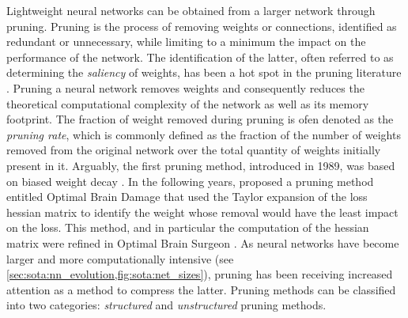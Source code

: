 Lightweight neural networks can be obtained from a larger network through
pruning. Pruning is the process of removing weights or connections, identified
as redundant or unnecessary, while limiting to a minimum the impact on the
performance of the network. The identification of the latter, often referred to
as determining the \emph{saliency} of weights, has been a hot spot in the
pruning literature \cite{li2023model,cheng2017survey,liang2021pruning}. Pruning
a neural network removes weights and consequently reduces the theoretical
computational complexity of the network as well as its memory footprint.  The
fraction of weight removed during pruning is ofen denoted as the \emph{pruning
rate}, which is commonly defined as the fraction of the number of weights
removed from the original network over the total quantity of weights initially
present in it. Arguably, the first pruning method, introduced in 1989, was based
on biased weight decay \cite{hanson1988comparing}. In the following years,
\citeauthor{DBLP:conf/nips/CunDS89} proposed a pruning method entitled Optimal
Brain Damage that used the Taylor expansion of the loss hessian matrix to
identify the weight whose removal would have the least impact on the loss. This
method, and in particular the computation of the hessian matrix were refined in
Optimal Brain Surgeon
\cite{DBLP:conf/nips/HassibiS92,DBLP:conf/nips/HassibiSW93,DBLP:conf/icnn/HassibiSW93}.
As neural networks have become larger and more computationally intensive (see
\cref{sec:sota:nn_evolution,fig:sota:net_sizes}), pruning has been receiving
increased attention as a method to compress the latter. Pruning methods can be
classified into two categories: \emph{structured} and \emph{unstructured}
pruning methods.\\


